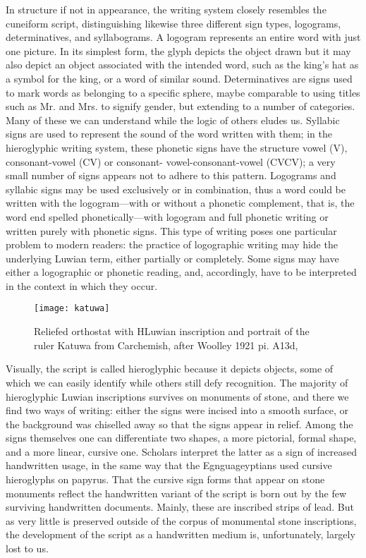 In structure if not in appearance, the
writing system closely resembles the cuneiform script, distinguishing likewise
three different sign types, logograms, determinatives, and syllabograms. A logogram
represents an entire word with just one picture. In its simplest form, the
glyph depicts the object drawn but it may also depict an object associated with
the intended word, such as the king’s hat as a symbol for the king, or a word of
similar sound. Determinatives are signs used to mark words as belonging to a
specific sphere, maybe comparable to using titles such as Mr. and Mrs. to signify
gender, but extending to a number of categories. Many of these we can understand
while the logic of others eludes us. Syllabic signs are used to represent the
sound of the word written with them; in the hieroglyphic writing system, these
phonetic signs have the structure vowel (V), consonant-vowel (CV) or consonant-
vowel-consonant-vowel (CVCV); a very small number of signs appears not
to adhere to this pattern. Logograms and syllabic signs may be used exclusively
or in combination, thus a word could be written with the logogram—with or
without a phonetic complement, that is, the word end spelled phonetically—with
logogram and full phonetic writing or written purely with phonetic signs. This
type of writing poses one particular problem to modern readers: the practice of
logographic writing may hide the underlying Luwian term, either partially or
completely. Some signs may have either a logographic or phonetic reading, and,
accordingly, have to be interpreted in the context in which they occur.

\begin{figure}[htbp]
\texttt{[image: katuwa]}
\caption{Reliefed orthostat with HLuwian inscription and portrait of the ruler Katuwa from
Carchemish, after Woolley 1921 pi. A13d, \protect\cite{Melchert2003}}
\end{figure}

Visually, the script is called hieroglyphic because it depicts objects, some
of which we can easily identify while others still defy recognition. The majority
of hieroglyphic Luwian inscriptions survives on monuments of stone, and 
there we find two ways of writing: either the signs were incised into a smooth
surface, or the background was chiselled away so that the signs appear in relief.
Among the signs themselves one can differentiate two shapes, a more pictorial,
formal shape, and a more linear, cursive one. Scholars interpret the latter as a
sign of increased handwritten usage, in the same way that the Egnguageyptians used
cursive hieroglyphs on papyrus. That the cursive sign forms that appear on stone
monuments reflect the handwritten variant of the script is born out by the few
surviving handwritten documents. Mainly, these are inscribed strips of lead. But
as very little is preserved outside of the corpus of monumental stone inscriptions,
the development of the script as a handwritten medium is, unfortunately, largely
lost to us.


